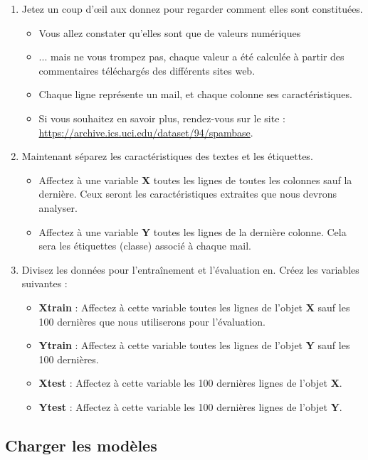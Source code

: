\begin{enumerate}
	\item Jetez un coup d’œil aux donnez pour regarder comment elles sont constituées.
	\begin{itemize}
		\item Vous allez constater qu'elles sont que de valeurs numériques
		\item ... mais ne vous trompez pas, chaque valeur a été calculée à partir des commentaires téléchargés des différents sites web.
		\item Chaque ligne représente un mail, et chaque colonne ses caractéristiques.
		\item Si vous souhaitez en savoir plus, rendez-vous sur le site : \url{https://archive.ics.uci.edu/dataset/94/spambase}.
	\end{itemize}
	\item Maintenant séparez les caractéristiques des textes et les étiquettes.
	\begin{itemize}
		\item Affectez à une variable \textbf{X} toutes les lignes de toutes les colonnes sauf la dernière. Ceux seront les caractéristiques extraites que nous devrons analyser.
		\item Affectez à une variable \textbf{Y} toutes les lignes de la dernière colonne. Cela sera les étiquettes (classe) associé à chaque mail.
	\end{itemize}
		\item Divisez les données pour l'entraînement et l'évaluation en. Créez les variables suivantes :
	\begin{itemize}
		\item \textbf{Xtrain} : Affectez à cette variable toutes les lignes de l'objet \textbf{X} sauf les 100 dernières que nous utiliserons pour l'évaluation.
		\item \textbf{Ytrain} : Affectez à cette variable toutes les lignes de l'objet \textbf{Y} sauf les 100 dernières.
		\item \textbf{Xtest} : Affectez à cette variable les 100 dernières lignes de l'objet \textbf{X}.
		\item \textbf{Ytest} : Affectez à cette variable les 100 dernières lignes de l'objet \textbf{Y}.
	\end{itemize}
\end{enumerate}

\subsection{Charger les modèles}

